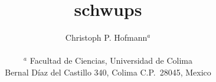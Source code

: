 \documentclass[11pt]{article}
\begin{document}
    \author{Christoph P. Hofmann$^a$ \\ \\
\normalsize{$^a$ Facultad de Ciencias, Universidad de Colima} \\
\vspace{0.3cm}
\normalsize {Bernal D\'iaz del Castillo 340, Colima C.P.\ 28045, Mexico} \\}

    \title{schwups}

    \maketitle
\end{document}
